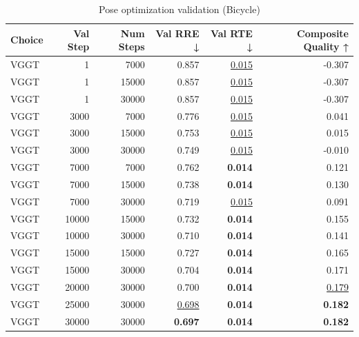 \begin{table}[H]
\caption{Pose optimization validation (Bicycle)}
\label{tab:04_pose_opt_validation_bicycle}
\begin{tabular}{lrrrrr}
\toprule
Choice & Val Step & Num Steps & Val RRE ↓ & Val RTE ↓ & Composite Quality ↑ \\
\midrule
VGGT & 1 & 7000 & 0.857 & \underline{0.015} & -0.307 \\
VGGT & 1 & 15000 & 0.857 & \underline{0.015} & -0.307 \\
VGGT & 1 & 30000 & 0.857 & \underline{0.015} & -0.307 \\
VGGT & 3000 & 7000 & 0.776 & \underline{0.015} & 0.041 \\
VGGT & 3000 & 15000 & 0.753 & \underline{0.015} & 0.015 \\
VGGT & 3000 & 30000 & 0.749 & \underline{0.015} & -0.010 \\
VGGT & 7000 & 7000 & 0.762 & \textbf{0.014} & 0.121 \\
VGGT & 7000 & 15000 & 0.738 & \textbf{0.014} & 0.130 \\
VGGT & 7000 & 30000 & 0.719 & \underline{0.015} & 0.091 \\
VGGT & 10000 & 15000 & 0.732 & \textbf{0.014} & 0.155 \\
VGGT & 10000 & 30000 & 0.710 & \textbf{0.014} & 0.141 \\
VGGT & 15000 & 15000 & 0.727 & \textbf{0.014} & 0.165 \\
VGGT & 15000 & 30000 & 0.704 & \textbf{0.014} & 0.171 \\
VGGT & 20000 & 30000 & 0.700 & \textbf{0.014} & \underline{0.179} \\
VGGT & 25000 & 30000 & \underline{0.698} & \textbf{0.014} & \textbf{0.182} \\
VGGT & 30000 & 30000 & \textbf{0.697} & \textbf{0.014} & \textbf{0.182} \\
\bottomrule
\end{tabular}
\end{table}
